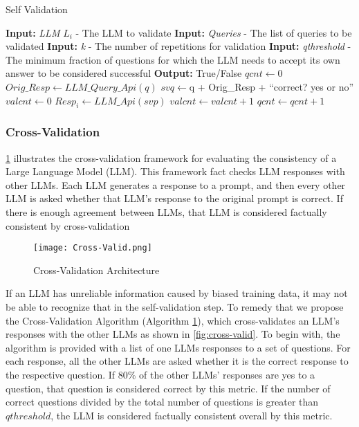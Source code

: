 \begin{algorithm}[tb]
\caption{Self Validation}
\label{Self Validation}
\begin{algorithmic}[1]
\Statex \textbf{Input:} \textit{LLM} $L_i$ - The LLM to validate
\Statex \textbf{Input:} \textit{Queries} - The list of queries to be validated
\Statex \textbf{Input:} \textit{k} - The number of repetitions for validation
\Statex \textbf{Input:} \textit{qthreshold} - The minimum fraction of questions for which the LLM needs to accept its own answer to be considered successful
\Statex
\Statex \textbf{Output:} True/False
\Statex
{}
\State $qcnt \gets 0$
  \State $Orig\_Resp \gets LLM\_Query\_Api(q)$
  \State $svq \gets $q + Orig\_Resp + ``correct? yes or no''
  \State $valcnt \gets 0$
    \State $Resp_i \gets LLM\_Api(svp)$
        \State $valcnt \gets valcnt + 1$
    \EndIf
  \EndFor
    \State $qcnt \gets qcnt + 1$
  \EndIf
\EndFor
{}
  \State {}
\Else
  \State {}
\EndIf
\EndProcedure
\end{algorithmic}
\end{algorithm}

\subsubsection{Cross-Validation}

\ref{fig:Cross-Valid-Alg-Fig} illustrates the cross-validation framework for evaluating the consistency of a Large Language Model (LLM). This framework fact checks LLM responses with other LLMs. Each LLM generates a response to a prompt, and then every other LLM is asked whether that LLM's response to the original prompt is correct. If there is enough agreement between LLMs, that LLM is considered factually consistent by cross-validation

\begin{figure}[!t]
    \centering
    \texttt{[image: Cross-Valid.png]}
    \caption{Cross-Validation Architecture}
    \label{fig:Cross-Valid-Alg-Fig}
\end{figure}

If an LLM has unreliable information caused by biased training data, it may not be able to recognize that in the self-validation step. To remedy that we propose the Cross-Validation Algorithm (Algorithm \ref{fig:Cross-Valid-Alg-Fig}), which cross-validates an LLM's responses with the other LLMs as shown in \ref{fig:cross-valid}. To begin with, the algorithm is provided with a list of one LLMs responses to a set of questions. For each response, all the other LLMs are asked whether it is the correct response to the respective question. If 80\% of the other LLMs' responses are yes to a question, that question is considered correct by this metric. If the number of correct questions divided by the total number of questions is greater than $qthreshold$, the LLM is considered factually consistent overall by this metric.

